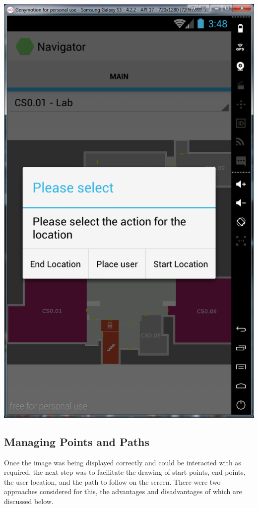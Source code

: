 \documentclass[12pt,a4paper]{report}
\begin{document}
                    
\begin{center}
\includegraphics[scale=0.5]{images/location_action.png}
\label{fig:androidStartEndMenu}
\end{center}                    
                                    
                
        \subsection{Managing Points and Paths}
            Once the image was being displayed correctly and could be interacted with as required, the next step was to facilitate the drawing of start points, end points, the user location,
            and the path to follow on the screen. There were two approaches considered for this, the advantages and disadvantages of which are discussed below.
\end{document}
